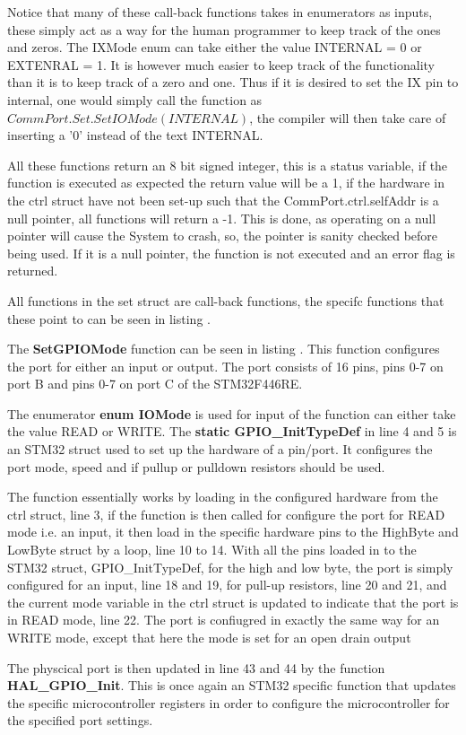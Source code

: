 Notice that many of these call-back functions takes in enumerators as inputs, these simply act as a way for the human programmer to keep track of the ones and zeros. The IXMode enum can take either the value INTERNAL = 0 or EXTENRAL = 1. It is however much easier to keep track of the functionality than it is to keep track of a zero and one. Thus if it is desired to set the IX pin to internal, one would simply call the function as $CommPort.Set.SetIOMode(INTERNAL)$, the compiler will then take care of inserting a '0' instead of the text INTERNAL. 

All these functions return an 8 bit signed integer, this is a status variable, if the function is executed as expected the return value will be a 1, if the hardware in the ctrl struct have not been set-up such that the CommPort.ctrl.selfAddr is a null pointer, all functions will return a -1. This is done, as operating on a null pointer will cause the System to crash, so, the pointer is sanity checked before being used. If it is a null pointer, the function is not executed and an error flag is returned.

All functions in the set struct are call-back functions, the specifc functions that these point to can be seen in listing .


The \textbf{SetGPIOMode} function can be seen in listing . This function configures the port for either an input or output. The port consists of 16 pins, pins 0-7 on port B and pins 0-7 on port C of the STM32F446RE.


The enumerator \textbf{enum IOMode} is used for input of the function can either take the value READ or WRITE. The \textbf{static GPIO\_InitTypeDef} in line 4 and 5 is an STM32 struct used to set up the hardware of a pin/port. It configures the port mode, speed and if pullup or pulldown resistors should be used.

The function essentially works by loading in the configured hardware from the ctrl struct, line 3, if the function is then called for configure the port for READ mode i.e. an input, it then load in the specific hardware pins to the HighByte and LowByte struct by a loop, line 10 to 14. With all the pins loaded in to the STM32 struct, GPIO\_InitTypeDef, for the high and low byte, the port is simply configured for an input, line 18 and 19, for pull-up resistors, line 20 and 21, and the current mode variable in the ctrl struct is updated to indicate that the port is in READ mode, line 22. The port is confiugred in exactly the same way for an WRITE mode, except that here the mode is set for an open drain output

The physcical port is then updated in line 43 and 44 by the function \textbf{HAL\_GPIO\_Init}. This is once again an STM32 specific function that updates the specific microcontroller registers in order to configure the microcontroller for the specified port settings.

